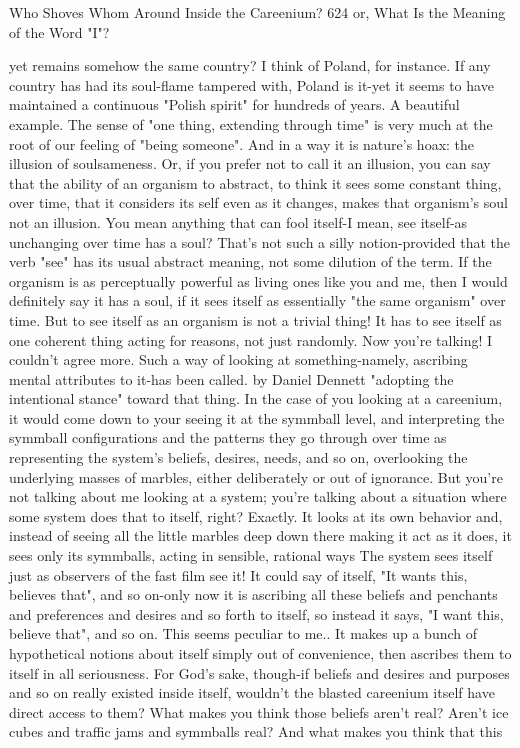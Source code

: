 Who Shoves Whom Around Inside the Careenium?                                         624
or, What Is the Meaning of the Word "I"?

  yet remains somehow the same country? I think of Poland, for instance. If any
  country has had its soul-flame tampered with, Poland is it-yet it seems to have
  maintained a continuous "Polish spirit" for hundreds of years.
\tortoise A beautiful example. The sense of "one thing, extending through time"
  is very much at the root of our feeling of "being someone". And in a way it is
  nature's hoax: the illusion of soulsameness. Or, if you prefer not to call it an
  illusion, you can say that the ability of an organism to abstract, to think it sees
  some constant thing, over time, that it considers its self even as it changes, makes
  that organism's soul not an illusion.
\achilles You mean anything that can fool itself-I mean, see itself-as unchanging
  over time has a soul?
\tortoise That's not such a silly notion-provided that the verb "see" has its usual
  abstract meaning, not some dilution of the term. If the organism is as perceptually
  powerful as living ones like you and me, then I would definitely say it has a soul, if
  it sees itself as essentially "the same organism" over time.
\achilles But to see itself as an organism is not a trivial thing! It has to see itself as
  one coherent thing acting for reasons, not just randomly.
\tortoise Now you're talking! I couldn't agree more. Such a way of looking at
  something-namely, ascribing mental attributes to it-has been called. by Daniel
  Dennett "adopting the intentional stance" toward that thing. In the case of you
  looking at a careenium, it would come down to your seeing it at the symmball
  level, and interpreting the symmball configurations and the patterns they go
  through over time as representing the system's beliefs, desires, needs, and so on,
  overlooking the underlying masses of marbles, either deliberately or out of
  ignorance.
\achilles But you're not talking about me looking at a system; you're talking about
  a situation where some system does that to itself, right?
\tortoise Exactly. It looks at its own behavior and, instead of seeing all the little
  marbles deep down there making it act as it does, it sees only its symmballs, acting
  in sensible, rational ways
\achilles The system sees itself just as observers of the fast film see it! It could
  say of itself, "It wants this, believes that", and so on-only now it is ascribing all
  these beliefs and penchants and preferences and desires and so forth to itself, so
  instead it says, "I want this, believe that", and so on. This seems peculiar to me.. It
  makes up a bunch of hypothetical notions about itself simply out of convenience,
  then ascribes them to itself in all seriousness. For God's sake, though-if beliefs and
  desires and purposes and so on really existed inside itself, wouldn't the blasted
  careenium itself have direct access to them?
\tortoise What makes you think those beliefs aren't real? Aren't ice cubes and
  traffic jams and symmballs real? And what makes you think that this




